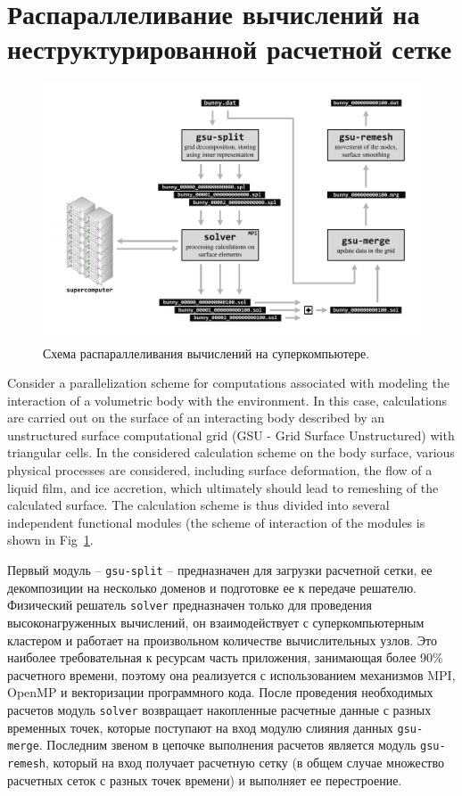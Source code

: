 \documentclass[
11pt,%
tightenlines,%
twoside,%
onecolumn,%
nofloats,%
nobibnotes,%
nofootinbib,%
superscriptaddress,%
noshowpacs,%
centertags]%
{revtex4}
\begin{document}
\section{Распараллеливание вычислений на неструктурированной расчетной сетке}

\begin{figure}[h]
\includegraphics[width=1.0\textwidth]{pics/02-scheme.pdf}
\caption{Схема распараллеливания вычислений на суперкомпьютере.}\label{fig:02-scheme}
\end{figure}

Consider a parallelization scheme for computations associated with modeling the interaction of a volumetric body with the environment.
In this case, calculations are carried out on the surface of an interacting body described by an unstructured surface computational grid (GSU - Grid Surface Unstructured) with triangular cells.
In the considered calculation scheme on the body surface, various physical processes are considered, including surface deformation, the flow of a liquid film, and ice accretion, which ultimately should lead to remeshing of the calculated surface.
The calculation scheme is thus divided into several independent functional modules (the scheme of interaction of the modules is shown in Fig~\ref{fig:02-scheme}.

Первый модуль -- \texttt{gsu-split} -- предназначен для загрузки расчетной сетки, ее декомпозиции на несколько доменов и подготовке ее к передаче решателю.
Физический решатель \texttt{solver} предназначен только для проведения высоконагруженных вычислений, он взаимодействует с суперкомпьютерным кластером и работает на произвольном количестве вычислительных узлов.
Это наиболее требовательная к ресурсам часть приложения, занимающая более 90\% расчетного времени, поэтому она реализуется с использованием механизмов MPI, OpenMP и векторизации программного кода.
После проведения необходимых расчетов модуль \texttt{solver} возвращает накопленные расчетные данные с разных временных точек, которые поступают на вход модулю слияния данных \texttt{gsu-merge}.
Последним звеном в цепочке выполнения расчетов является модуль \texttt{gsu-remesh}, который на вход получает расчетную сетку (в общем случае множество расчетных сеток с разных точек времени) и выполняет ее перестроение. 
\end{document}
